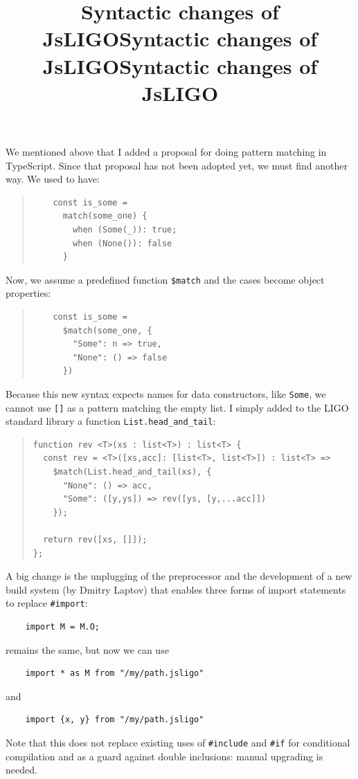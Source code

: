 \documentclass[wide]{slides}
\newcommand{\TypeScript}[0]{\textsf{TypeScript}}
\begin{document}
\begin{slide}
  \title{Syntactic changes of JsLIGO}

  We mentioned above that I added a proposal for doing pattern
  matching in \TypeScript{}. Since that proposal has not been adopted
  yet, we must find another way. We used to have:
  \begin{quote}
  \begin{lstlisting}
    const is_some =
      match(some_one) {
        when (Some(_)): true;
        when (None()): false
      }
  \end{lstlisting}
  \end{quote}
  Now, we assume a predefined function \verb|$match| and the cases
  become object properties:
  \begin{quote}
  \begin{lstlisting}
    const is_some =
      $match(some_one, {
        "Some": n => true,
        "None": () => false
      })
  \end{lstlisting}
  \end{quote}

\end{slide}

\begin{slide}
  \title{Syntactic changes of JsLIGO}

  Because this new syntax expects names for data constructors, like
  \verb|Some|, we cannot use \verb|[]| as a pattern matching the empty
  list. I simply added to the LIGO standard library a function
  \verb|List.head_and_tail|:
  \begin{quote}
  \begin{lstlisting}
function rev <T>(xs : list<T>) : list<T> {
  const rev = <T>([xs,acc]: [list<T>, list<T>]) : list<T> =>
    $match(List.head_and_tail(xs), {
      "None": () => acc,
      "Some": ([y,ys]) => rev([ys, [y,...acc]])
    });

  return rev([xs, []]);
};
  \end{lstlisting}
  \end{quote}

\end{slide}

\begin{slide}
  \title{Syntactic changes of JsLIGO}

  A big change is the unplugging of the preprocessor and the
  development of a new build system (by Dmitry Laptov) that enables
  three forms of import statements to replace \verb|#import|:
  \begin{lstlisting}
    import M = M.O;
  \end{lstlisting}
  remains the same, but now we can use
  \begin{lstlisting}
    import * as M from "/my/path.jsligo"
  \end{lstlisting}
  and
  \begin{lstlisting}
    import {x, y} from "/my/path.jsligo"
  \end{lstlisting}
  Note that this does not replace existing uses of \verb|#include| and
  \verb|#if| for conditional compilation and as a guard against double
  inclusions: manual upgrading is needed.

\end{slide}
\end{document}
